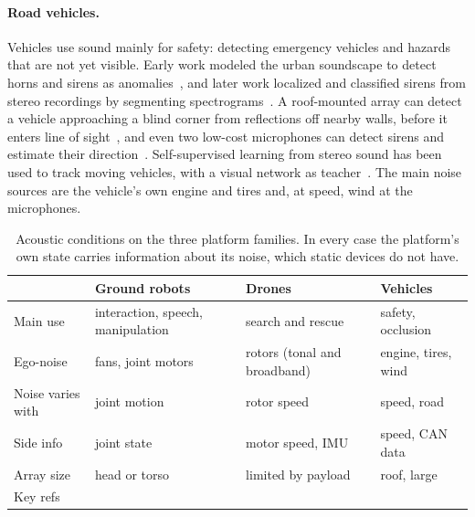 \paragraph{Road vehicles.}
Vehicles use sound mainly for safety: detecting emergency vehicles and hazards that are not yet visible.
Early work modeled the urban soundscape to detect horns and sirens as anomalies~\cite{marchegiani2017urban}, and later work localized and classified sirens from stereo recordings by segmenting spectrograms~\cite{marchegiani2022sirens}.
A roof-mounted array can detect a vehicle approaching a blind corner from reflections off nearby walls, before it enters line of sight~\cite{schulz2021hearing}, and even two low-cost microphones can detect sirens and estimate their direction~\cite{sun2021siren}.
Self-supervised learning from stereo sound has been used to track moving vehicles, with a visual network as teacher~\cite{gan2019stereo}.
The main noise sources are the vehicle's own engine and tires and, at speed, wind at the microphones.

\begin{table}[t]
\centering
\footnotesize
\setlength{\tabcolsep}{3pt}
\begin{tabular}{@{}L{1.55cm}L{2.0cm}L{2.0cm}L{2.0cm}@{}}
\toprule
 & Ground robots & Drones & Vehicles \\
\midrule
Main use & interaction, speech, manipulation & search and rescue & safety, occlusion \\
Ego-noise & fans, joint motors & rotors (tonal and broadband) & engine, tires, wind \\
Noise varies with & joint motion & rotor speed & speed, road \\
Side info & joint state & motor speed, IMU & speed, CAN data \\
Array size & head or torso & limited by payload & roof, large \\
Key refs & \cite{nakadai2000active,valin2007tracking,ince2009template,schmidt2018egonoise} & \cite{strauss2018dregon,furukawa2013ncm,yen2023ncm,hoshiba2017uav} & \cite{schulz2021hearing,marchegiani2017urban,marchegiani2022sirens,gan2019stereo} \\
\bottomrule
\end{tabular}
\caption{Acoustic conditions on the three platform families. In every case the platform's own state carries information about its noise, which static devices do not have.}
\label{tab:platforms}
\end{table}
